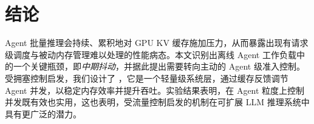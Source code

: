 \section{结论}

Agent 批量推理会持续、累积地对 GPU KV 缓存施加压力，从而暴露出现有请求级调度与被动内存管理难以处理的性能病态。本文识别出离线 Agent 工作负载中的一个关键瓶颈，即\emph{中期抖动}，并据此提出需要转向主动的 Agent 级准入控制。受拥塞控制启发，我们设计了 \SysName{}，它是一个轻量级系统层，通过缓存反馈调节 Agent 并发，以稳定内存效率并提升吞吐。实验结果表明，在 Agent 粒度上控制并发既有效也实用，这也表明，受流量控制启发的机制在可扩展 LLM 推理系统中具有更广泛的潜力。
